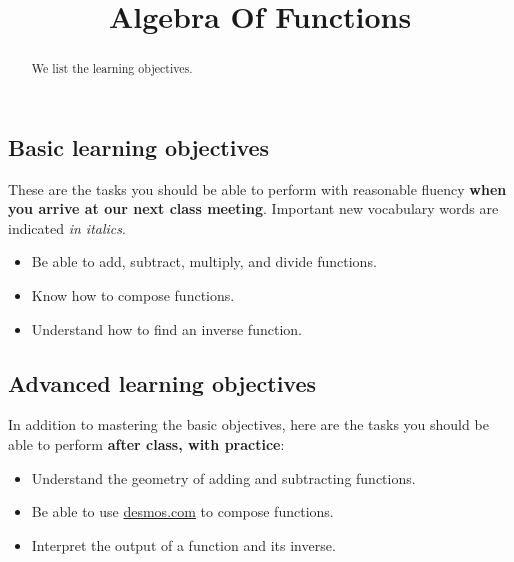 \documentclass{ximera}
\title{Algebra Of Functions}
\begin{document}
\begin{abstract}
We list the learning objectives.
\end{abstract}
\maketitle

\subsection*{Basic learning objectives}

These are the tasks you should be able to perform with reasonable fluency \textbf{when you arrive at our next class meeting}. Important new vocabulary words are indicated \emph{in italics}. 

\begin{itemize}
	\item Be able to add, subtract, multiply, and divide functions.
	\item Know how to compose functions. 
	\item Understand how to find an inverse function.
\end{itemize}

\subsection*{Advanced learning objectives}

In addition to mastering the basic objectives, here are the tasks you should be able to perform \textbf{after class, with practice}: 

\begin{itemize}
	\item Understand the geometry of adding and subtracting functions.
	\item Be able to use \url{desmos.com} to compose functions.
	\item Interpret the output of a function and its inverse.
\end{itemize}
\end{document}
